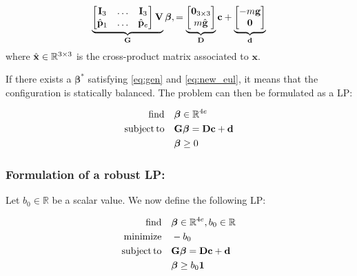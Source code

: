 \begin{align} \label{eq:new_eul}
\underbrace{
\mat{\mathbf{I}_3 & \dots & \mathbf{I}_3 \\
\hat{\mathbf{p}}_1 & \dots & \hat{\mathbf{p}}_e} \mathbf{V}
}_\mathbf{G} \bm{\beta}, = 
\underbrace{\mat{\mathbf{0}_{3\times 3} \\ m \hat{\mathbf{g}}}}_{\mathbf{D}} \mathbf{c} + 
\underbrace{\mat{-m\mathbf{g} \\ \mathbf{0}}}_{\mathbf{d}}
\end{align}
where $\hat{\mathbf{x}} \in \mathbb{R}^{3\times 3}$ is the cross-product matrix associated to $\mathbf{x}$.

If there exists a $\bm{\beta}^*$ satisfying \eqref{eq:gen} and \eqref{eq:new_eul}, it means that the configuration is statically balanced.
The problem can then be formulated as a LP:

\begin{equation} \label{eq:lin_prog} \begin{aligned}
\find \quad & \bm{\beta} \in \Rv{4e} \\
\st \quad &\mathbf{G} \bm{\beta} = \mathbf{D} \mathbf{c} + \mathbf{d} \\
& \bm{\beta} \ge 0 \\
\end{aligned} \end{equation}

\subsubsection{Formulation of a robust LP:}
Let $b_0 \in \mathbb{R}$ be a scalar value. We now define the following LP:

\begin{equation} \label{eq:lin_prog_rob} \begin{aligned}
\find \quad & \bm{\beta} \in \Rv{4e}, b_0 \in \Rv{} \\
\minimize  \quad & -b_0 \\
\st \quad &\mathbf{G} \bm{\beta} = \mathbf{D} \mathbf{c} + \mathbf{d} \\
& \bm{\beta} \ge b_0 \bm{1}\\
\end{aligned} \end{equation}

